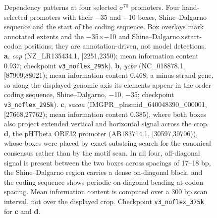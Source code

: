 \begin{figure}[h]
    \centering
\caption{
Dependency patterns at four selected $\sigma^{70}$ promoters. Four hand-selected promoters with their $-$35 and $-$10 boxes, Shine--Dalgarno sequence and the start of the coding sequence. Box overlays mark annotated extents and the $-$35$\times$$-$10 and Shine--Dalgarno$\times$start-codon positions; they are annotation-driven, not model detections. \textbf{a}, \emph{cop} (NZ\_LR135434.1, [2251,2350); mean information content 0.937; checkpoint \texttt{v3\_noflex\_295k}). \textbf{b}, \emph{ycbr} (NC\_018878.1, [87909,88021); mean information content 0.468; a minus-strand gene, so along the displayed genomic axis its elements appear in the order coding sequence, Shine--Dalgarno, $-$10, $-$35; checkpoint \texttt{v3\_noflex\_295k}). \textbf{c}, \emph{sacaa} (IMGPR\_plasmid\_640048390\_000001, [27668,27762); mean information content 0.385), where both boxes also project extended vertical and horizontal signal across the crop. \textbf{d}, the pHTbeta ORF32 promoter (AB183714.1, [30597,30706)), whose boxes were placed by exact substring search for the canonical consensus rather than by the motif scan. In all four, off-diagonal signal is present between the two boxes across spacings of 17--18 bp, the Shine--Dalgarno region carries a dense on-diagonal block, and the coding sequence shows periodic on-diagonal beading at codon spacing. Mean information content is computed over a 300 bp scan interval, not over the displayed crop. Checkpoint \texttt{v3\_noflex\_375k} for \textbf{c} and \textbf{d}.
}
\label{fig:supp-promoter}
\end{figure}

